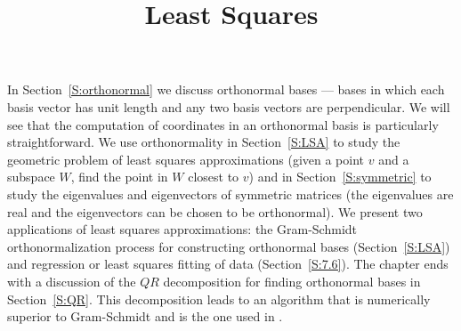 \documentclass{ximera}
\title{Least Squares}
\begin{document}
\begin{abstract}
\end{abstract}
\maketitle

\normalsize


In Section~\ref{S:orthonormal} we discuss orthonormal bases --- bases in
which each basis vector has unit length and any two basis vectors are 
perpendicular.
We will see that the computation of coordinates in an orthonormal basis is
particularly straightforward.  We
use orthonormality in Section~\ref{S:LSA} to study the geometric problem of
least squares approximations (given a point $v$ and a subspace $W$, find
the point in $W$ closest to $v$) and in Section~\ref{S:symmetric} to study
the eigenvalues and eigenvectors of symmetric matrices (the eigenvalues are
real and the eigenvectors can be chosen to be orthonormal).  We present two
applications of least squares approximations:  the  Gram-Schmidt
orthonormalization process for constructing orthonormal bases
(Section~\ref{S:LSA}) and regression or least squares fitting of data
(Section~\ref{S:7.6}).   The chapter ends with a discussion of the $QR$
decomposition for finding orthonormal bases in Section~\ref{S:QR}.  This
decomposition leads to an algorithm that is numerically superior to
Gram-Schmidt and is the one used in \Matlabp.
\end{document}
